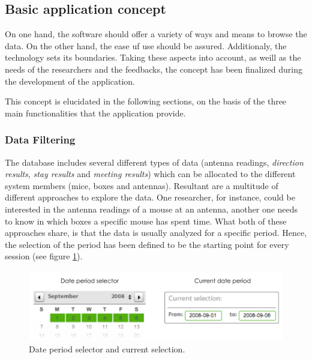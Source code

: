 \subsection{Basic application concept}
\label{subsec:app_concept}

On one hand, the software should offer a variety of ways and means to browse the data. On the other hand, the ease uf use should be assured. Additionaly, the technology sets its boundaries. Taking these aspects into account, as weill as the needs of the researchers and the feedbacks, the concept has been finalized during the development of the application. 

This concept is elucidated in the following sections, on the basis of the three main functionalities that the application provide. 
   
\subsubsection{Data Filtering}
\label{sububsec:datafilter}

The database includes several different types of data (antenna readings, \textit{direction results}, \textit{stay results} and \textit{meeting results}) which can be allocated to the different system members (mice, boxes and antennas). Resultant are a multitude of different approaches to explore the data. One researcher, for instance, could be interested in the antenna readings of a mouse at an antenna, another one needs to know in which boxes a specific mouse has spent time. What both of these approaches share, is that the data is usually analyzed for a specific period. Hence, the selection of the period has been defined to be the starting point for every session (see figure \ref{fig:date_period}).

\begin{figure}[htpb]
\begin{center}
  \includegraphics[width=.75\textwidth]{assets/pdf/date_period.pdf}
  \caption[Date period selection]{Date period selector and current selection.}
  \label{fig:date_period}
\end{center}
\end{figure}

